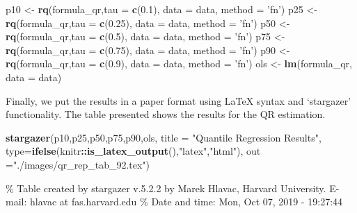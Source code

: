 \documentclass[]{book}
\newenvironment{Shaded}{\begin{snugshade}}{\end{snugshade}}
\newcommand{\KeywordTok}[1]{\textcolor[rgb]{0.13,0.29,0.53}{\textbf{#1}}}
\newcommand{\DataTypeTok}[1]{\textcolor[rgb]{0.13,0.29,0.53}{#1}}
\newcommand{\FloatTok}[1]{\textcolor[rgb]{0.00,0.00,0.81}{#1}}
\newcommand{\StringTok}[1]{\textcolor[rgb]{0.31,0.60,0.02}{#1}}
\newcommand{\OperatorTok}[1]{\textcolor[rgb]{0.81,0.36,0.00}{\textbf{#1}}}
\newcommand{\NormalTok}[1]{#1}
\begin{document}
\begin{Shaded}
\begin{Highlighting}[]
\NormalTok{p10 <-}\StringTok{ }\KeywordTok{rq}\NormalTok{(formula_qr,}\DataTypeTok{tau =} \KeywordTok{c}\NormalTok{(}\FloatTok{0.1}\NormalTok{), }\DataTypeTok{data =}\NormalTok{ data, }\DataTypeTok{method =} \StringTok{'fn'}\NormalTok{)}
\NormalTok{p25 <-}\StringTok{ }\KeywordTok{rq}\NormalTok{(formula_qr,}\DataTypeTok{tau =} \KeywordTok{c}\NormalTok{(}\FloatTok{0.25}\NormalTok{), }\DataTypeTok{data =}\NormalTok{ data, }\DataTypeTok{method =} \StringTok{'fn'}\NormalTok{)}
\NormalTok{p50 <-}\StringTok{ }\KeywordTok{rq}\NormalTok{(formula_qr,}\DataTypeTok{tau =} \KeywordTok{c}\NormalTok{(}\FloatTok{0.5}\NormalTok{), }\DataTypeTok{data =}\NormalTok{ data, }\DataTypeTok{method =} \StringTok{'fn'}\NormalTok{)}
\NormalTok{p75 <-}\StringTok{ }\KeywordTok{rq}\NormalTok{(formula_qr,}\DataTypeTok{tau =} \KeywordTok{c}\NormalTok{(}\FloatTok{0.75}\NormalTok{), }\DataTypeTok{data =}\NormalTok{ data, }\DataTypeTok{method =} \StringTok{'fn'}\NormalTok{)}
\NormalTok{p90 <-}\StringTok{ }\KeywordTok{rq}\NormalTok{(formula_qr,}\DataTypeTok{tau =} \KeywordTok{c}\NormalTok{(}\FloatTok{0.9}\NormalTok{), }\DataTypeTok{data =}\NormalTok{ data, }\DataTypeTok{method =} \StringTok{'fn'}\NormalTok{)}
\NormalTok{ols <-}\StringTok{ }\KeywordTok{lm}\NormalTok{(formula_qr, }\DataTypeTok{data =}\NormalTok{ data)}
\end{Highlighting}
\end{Shaded}

Finally, we put the results in a paper format using LaTeX syntax and
`stargazer' functionality. The table presented shows the results for the
QR estimation.

\begin{Shaded}
\begin{Highlighting}[]
\KeywordTok{stargazer}\NormalTok{(p10,p25,p50,p75,p90,ols, }\DataTypeTok{title =} \StringTok{"Quantile Regression Results"}\NormalTok{, }
          \DataTypeTok{type=}\KeywordTok{ifelse}\NormalTok{(knitr}\OperatorTok{::}\KeywordTok{is_latex_output}\NormalTok{(),}\StringTok{"latex"}\NormalTok{,}\StringTok{"html"}\NormalTok{), }\DataTypeTok{out =}\StringTok{"./images/qr_rep_tab_92.tex"}\NormalTok{)}
\end{Highlighting}
\end{Shaded}

\% Table created by stargazer v.5.2.2 by Marek Hlavac, Harvard
University. E-mail: hlavac at fas.harvard.edu \% Date and time: Mon, Oct
07, 2019 - 19:27:44
\end{document}
